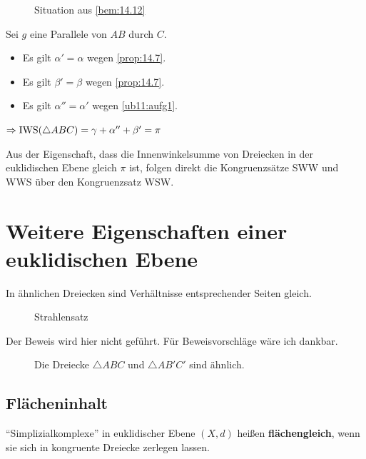 \begin{figure}[htp]
    \centering
    
    \caption{Situation aus \cref{bem:14.12}}
    \label{fig:14.12}
\end{figure}

\begin{beweis}
    Sei $g$ eine Parallele von $AB$ durch $C$. 

    \begin{itemize}
        \item Es gilt $\alpha' = \alpha$ wegen \cref{prop:14.7}.
        \item Es gilt $\beta' = \beta$ wegen \cref{prop:14.7}.
        \item Es gilt $\alpha'' = \alpha'$ wegen \cref{ub11:aufg1}.
    \end{itemize}
    $\Rightarrow \operatorname{IWS}(\triangle ABC) = \gamma + \alpha'' + \beta' = \pi$
\end{beweis}

Aus der Eigenschaft, dass die Innenwinkelsumme von Dreiecken in der euklidischen Ebene
gleich $\pi$ ist, folgen direkt die Kongruenzsätze SWW und WWS über den Kongruenzsatz
WSW.

\section{Weitere Eigenschaften einer euklidischen Ebene}
\begin{satz}[Strahlensatz]
    In ähnlichen Dreiecken sind Verhältnisse entsprechender Seiten gleich.
\end{satz}

\begin{figure}[htp]
    \centering
    
    \caption{Strahlensatz}
    \label{fig:hyperbolische-geometrie-2}
\end{figure}

Der Beweis wird hier nicht geführt. Für Beweisvorschläge wäre ich 
dankbar.

\begin{figure}[htp]
    \centering
    
    \caption{Die Dreiecke $\triangle ABC$ und $\triangle AB'C'$ sind ähnlich.}
    \label{fig:triangle-similar}
\end{figure}

\subsection{Flächeninhalt}
\begin{definition}%
    \enquote{Simplizialkomplexe} in euklidischer Ebene $(X,d)$ heißen
    \textbf{flächengleich},
    wenn sie sich in kongruente Dreiecke zerlegen lassen.
\end{definition}

